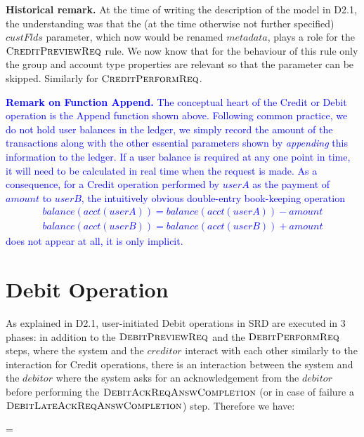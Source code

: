 {\bf Historical remark.} At the time of writing the description of the model in D2.1, the understanding was that the (at the time otherwise not further specified) $custFlds$ parameter, which now would be renamed $metadata$, plays a role for the $\hbox{\sc CreditPreviewReq}$ rule. We now know that for the behaviour of this rule only the group and account type properties are relevant so that the parameter can be skipped. Similarly for $\hbox{\sc CreditPerformReq}$.

\textcolor{blue}{
{\bf Remark on Function Append.} The conceptual heart of the Credit or Debit operation is the Append function shown above. Following common practice, we do not hold user balances in the ledger, we simply record the amount of the transactions along with the other essential parameters shown by \emph{appending} this information to the ledger. If a user balance is required at any one point in time, it will need to be calculated in real time when the request is made. As a consequence, for a Credit operation performed by $userA$ as the payment of $amount$ to $userB$, the intuitively obvious double-entry book-keeping operation
\begin{align*}
balance(acct(userA)) = balance(acct(userA)) - amount \\
balance(acct(userB)) = balance(acct(userB)) + amount
\end{align*}
does not appear at all, it is only implicit.
}


\section{Debit Operation} 
\label{sect:debitops}

As explained in D2.1, user-initiated Debit operations in SRD are executed in 3 phases: in addition to the $\hbox{\sc DebitPreviewReq}$ and the $\hbox{\sc DebitPerformReq}$ steps, where the system and the $creditor$ interact with each other similarly to the interaction for Credit operations, there is an interaction between the system and the $debitor$ where the system asks for an acknowledgement from the $debitor$ before performing the $\hbox{\sc DebitAckReqAnswCompletion}$ (or in case of failure a $\hbox{\sc DebitLateAckReqAnswCompletion}$) step. Therefore we have:

\begin{asm}
=\+
    \\
    \\
   \\
\end{asm}


